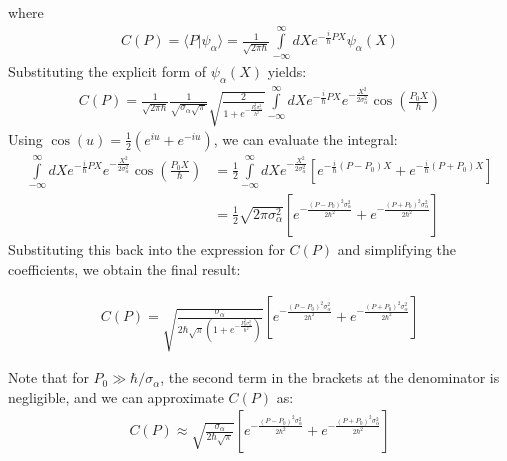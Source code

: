 where
\begin{align}
  C(P) = \langle P|\psi_\alpha\rangle = \frac{1}{\sqrt{2\pi\hbar}}\int\limits_{-\infty}^{\infty}dX e^{-\frac{i}{\hbar}PX}\psi_\alpha(X)
\end{align}
Substituting the explicit form of $\psi_\alpha(X)$ yields:
\begin{align}
  C(P) = \frac{1}{\sqrt{2\pi\hbar}}\frac{1}{\sqrt{\sigma_\alpha\sqrt{\pi}}}\sqrt{\frac{2}{1+e^{-\frac{P_0^2\sigma_\alpha^2}{\hbar^2}}}}\int\limits_{-\infty}^{\infty}dX e^{-\frac{i}{\hbar}PX}e^{-\frac{X^2}{2\sigma_\alpha^2}}\cos\left(\frac{P_0 X}{\hbar}\right)
\end{align}
Using $\cos(u) = \frac{1}{2}(e^{iu} + e^{-iu})$, we can evaluate the integral:
\begin{align}
  \int\limits_{-\infty}^{\infty}dX e^{-\frac{i}{\hbar}PX}e^{-\frac{X^2}{2\sigma_\alpha^2}}\cos\left(\frac{P_0 X}{\hbar}\right) & = \frac{1}{2}\int\limits_{-\infty}^{\infty}dX e^{-\frac{X^2}{2\sigma_\alpha^2}}\left[ e^{-\frac{i}{\hbar}(P-P_0)X} + e^{-\frac{i}{\hbar}(P+P_0)X} \right] \nonumber \\
  & = \frac{1}{2}\sqrt{2\pi\sigma_\alpha^2}\left[ e^{-\frac{(P-P_0)^2\sigma_\alpha^2}{2\hbar^2}} + e^{-\frac{(P+P_0)^2\sigma_\alpha^2}{2\hbar^2}} \right]
\end{align}
Substituting this back into the expression for $C(P)$ and simplifying the coefficients, we obtain the final result:
\begin{importantbox}
  \begin{align}
    C(P) = \sqrt{\frac{\sigma_\alpha}{2\hbar\sqrt{\pi}\left(1+e^{-\frac{P_0^2\sigma_\alpha^2}{\hbar^2}}\right)}}\left[ e^{-\frac{(P-P_0)^2\sigma_\alpha^2}{2\hbar^2}} + e^{-\frac{(P+P_0)^2\sigma_\alpha^2}{2\hbar^2}} \right]\label{C(P)-two-atom}
  \end{align}

  Note that for $P_0 \gg \hbar/\sigma_\alpha$, the second term in the brackets at the denominator  is negligible, and we can approximate $C(P)$ as:
  \begin{align}
    C(P) \approx \sqrt{\frac{\sigma_\alpha}{2\hbar\sqrt{\pi}}}\left[ e^{-\frac{(P-P_0)^2\sigma_\alpha^2}{2\hbar^2}}+ e^{-\frac{(P+P_0)^2\sigma_\alpha^2}{2\hbar^2}} \right]\label{C(P)-two-atom-approx}
  \end{align}
\end{importantbox}
